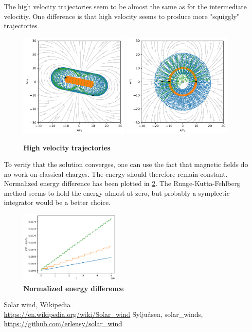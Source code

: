 \documentclass[11pt]{article}
\begin{document}
\newpage
\noindent The high velocity trajectories seem to be almost the same as for the intermediate velocitiy. One difference is that high velocity seems to produce more "squiggly" trajectories.
\begin{figure}[!htp]
    \centering
    \captionsetup{justification=centering}
    \includegraphics[width=0.49\textwidth]{../figures/report/trajectoriesHighXZ}
    \includegraphics[width=0.49\textwidth]{../figures/report/trajectoriesHighXY}
    \caption{\textbf{High velocity trajectories}}
    \label{fig:high_trajectories}
\end{figure}

\noindent To verify that the solution converges, one can use the fact that magnetic fields do no work on classical charges. The energy should therefore remain constant. Normalized energy difference has been plotted in \ref{fig:energy}. The Runge-Kutta-Fehlberg method seems to hold the energy almost at zero, but probably a symplectic integrator would be a better choice.

\begin{figure}[!htp]
    \centering
    \captionsetup{justification=centering}
    \includegraphics[width=0.45\textwidth]{../figures/report/energyDifference.pdf}
    \caption{\textbf{Normalized energy difference}}
    \label{fig:energy}
\end{figure}

\begin{thebibliography}{99}
     Solar wind, Wikipedia \\ \url{https://en.wikipedia.org/wiki/Solar_wind}
     Syljuåsen, solar\_winds, \\\url{https://github.com/erlensy/solar_wind}
\end{thebibliography}
\end{document}
